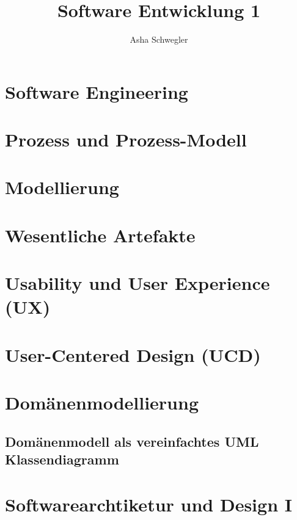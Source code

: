 \documentclass{article}
\title{Software Entwicklung 1}
\author{Asha Schwegler}
\begin{document}
\maketitle
\tableofcontents
\newpage


\section{Software Engineering}



\section{Prozess und Prozess-Modell}



\section{Modellierung}



\section{Wesentliche Artefakte}

\section{Usability und User Experience (UX)}


\section{User-Centered Design (UCD)}


\section{Domänenmodellierung}




\subsection{Domänenmodell als vereinfachtes UML Klassendiagramm}



\section{Softwarearchtiketur und Design I}
\end{document}
